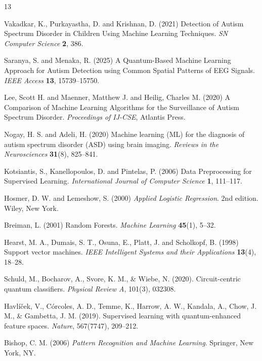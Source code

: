 \documentclass[runningheads]{llncs}
\begin{document}
\begin{thebibliography}{13}

Vakadkar, K., Purkayastha, D. and Krishnan, D. (2021) Detection of Autism Spectrum Disorder in Children Using Machine Learning Techniques. \emph{SN Computer Science} \textbf{2}, 386.

Saranya, S. and Menaka, R. (2025) A Quantum-Based Machine Learning Approach for Autism Detection using Common Spatial Patterns of EEG Signals. \emph{IEEE Access} \textbf{13}, 15739--15750.

Lee, Scott H. and Maenner, Matthew J. and Heilig, Charles M. (2020) A Comparison of Machine Learning Algorithms for the Surveillance of Autism Spectrum Disorder. \emph{Proceedings of IJ-CSE}, Atlantis Press.



Nogay, H. S. and Adeli, H. (2020) Machine learning (ML) for the diagnosis of autism spectrum disorder (ASD) using brain imaging. \emph{Reviews in the Neurosciences} \textbf{31}(8), 825--841.


Kotsiantis, S., Kanellopoulos, D. and Pintelas, P. (2006) Data Preprocessing for Supervised Learning. \emph{International Journal of Computer Science} \textbf{1}, 111--117.

Hosmer, D. W. and Lemeshow, S. (2000) \emph{Applied Logistic Regression}. 2nd edition. Wiley, New York.

Breiman, L. (2001) Random Forests. \emph{Machine Learning} \textbf{45}(1), 5--32.


Hearst, M. A., Dumais, S. T., Osuna, E., Platt, J. and Scholkopf, B. (1998) Support vector machines. \emph{IEEE Intelligent Systems and their Applications} \textbf{13}(4), 18--28.

Schuld, M., Bocharov, A., Svore, K. M., \& Wiebe, N. (2020). Circuit-centric quantum classifiers. \emph{Physical Review A}, 101(3), 032308.

Havl\'{i}\v{c}ek, V., C\'{o}rcoles, A. D., Temme, K., Harrow, A. W., Kandala, A., Chow, J. M., \& Gambetta, J. M. (2019). Supervised learning with quantum-enhanced feature spaces. \emph{Nature}, 567(7747), 209--212.


Bishop, C. M. (2006) \emph{Pattern Recognition and Machine Learning}. Springer, New York, NY.


\end{thebibliography}
\end{document}
